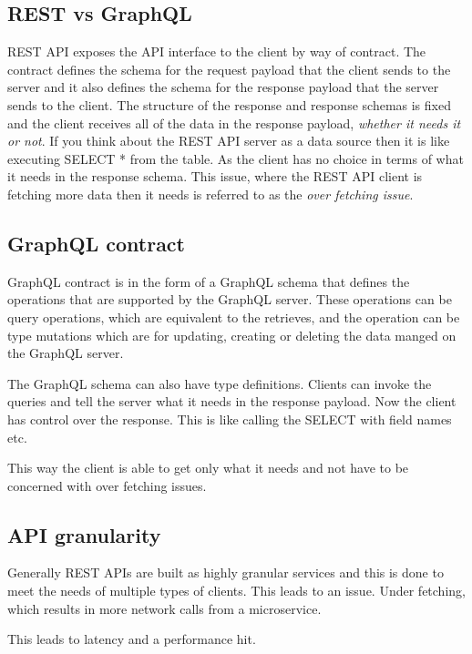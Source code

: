 \subsection{REST vs GraphQL}
REST API exposes the API interface to the client by way of contract.
The contract defines the schema for the request payload that the client sends to the server and it also defines the schema for the response payload that the server sends to the client.
The structure of the response and response schemas is fixed and the client receives all of the data in the response payload, \textit{whether it needs it or not}.
If you think about the REST API server as a data source then it is like executing SELECT * from the table.
As the client has no choice in terms of what it needs in the response schema.
This issue, where the REST API client is fetching more data then it needs is referred to as the \textit{over fetching issue}.

\subsection{GraphQL contract}
GraphQL contract is in the form of a GraphQL schema that defines the operations that are supported by the GraphQL server.
These operations can be query operations, which are equivalent to the retrieves, and the operation can be type mutations which are for updating, creating or deleting the data manged on the GraphQL server.

The GraphQL schema can also have type definitions.
Clients can invoke the queries and tell the server what it needs in the response payload.
Now the client has control over the response.
This is like calling the SELECT with field names etc.
\begin{note}
    This way the client is able to get only what it needs and not have to be concerned with over fetching issues.
\end{note}

\subsection{API granularity}
Generally REST APIs are built as highly granular services and this is done to meet the needs of multiple types of clients.
This leads to an issue.
Under fetching, which results in more network calls from a microservice.
\begin{note}
    This leads to latency and a performance hit.
\end{note}

